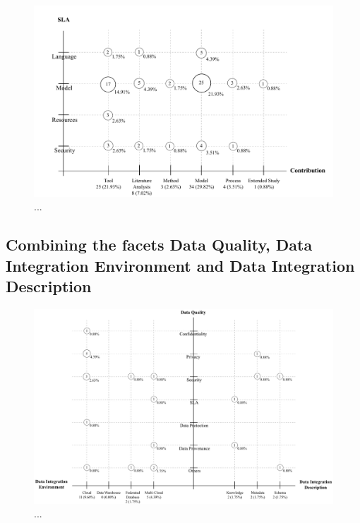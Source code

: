\begin{figure}[h!]
\centering
\includegraphics[scale=0.7]{figs/bubble-charts/SLA-Contribution.pdf}
\caption{...}
\end{figure}


\subsection{Combining the facets Data Quality, Data Integration Environment and Data Integration Description}

\begin{figure}[h!]
\centering
\includegraphics[scale=0.53]{figs/bubble-charts/Data-Quality-DI.pdf}
\caption{...}
\end{figure}
